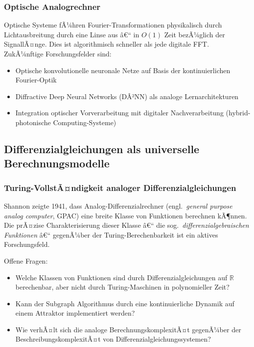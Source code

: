 ﻿\documentclass[a4paper,12pt]{article}
\theoremstyle{definition}
\begin{document}
\subsubsection{Optische Analogrechner}

Optische Systeme fÃ¼hren Fourier-Transformationen physikalisch durch Lichtausbreitung
durch eine Linse aus â€“ in $O(1)$ Zeit bezÃ¼glich der SignallÃ¤nge.  Dies ist
algorithmisch schneller als jede digitale FFT.  ZukÃ¼nftige Forschungsfelder sind:
\begin{itemize}
    \item Optische konvolutionelle neuronale Netze auf Basis der kontinuierlichen
          Fourier-Optik \citep{Lin2018}
    \item Diffractive Deep Neural Networks (DÂ²NN) als analoge Lernarchitekturen
    \item Integration optischer Vorverarbeitung mit digitaler Nachverarbeitung
          (hybrid-photonische Computing-Systeme)
\end{itemize}

\subsection{Differenzialgleichungen als universelle Berechnungsmodelle}

\subsubsection{Turing-VollstÃ¤ndigkeit analoger Differenzialgleichungen}

Shannon \citep{Shannon1941} zeigte 1941, dass Analog-Differenzialrechner
(engl.\ \emph{general purpose analog computer}, GPAC) eine breite Klasse von
Funktionen berechnen kÃ¶nnen.  Die prÃ¤zise Charakterisierung dieser Klasse â€“
die sog.\ \emph{differenzialgebraischen Funktionen} â€“ gegenÃ¼ber der Turing-Berechenbarkeit
ist ein aktives Forschungsfeld.

Offene Fragen:
\begin{itemize}
    \item Welche Klassen von Funktionen sind durch Differenzialgleichungen auf $\mathbb{R}$
          berechenbar, aber nicht durch Turing-Maschinen in polynomieller Zeit?
    \item Kann der Subgraph Algorithmus \citep{Epp2026subgraph} durch eine
          kontinuierliche Dynamik auf einem Attraktor implementiert werden?
    \item Wie verhÃ¤lt sich die analoge BerechnungskomplexitÃ¤t gegenÃ¼ber der
          BeschreibungskomplexitÃ¤t von Differenzialgleichungssystemen?
\end{itemize}
\end{document}
